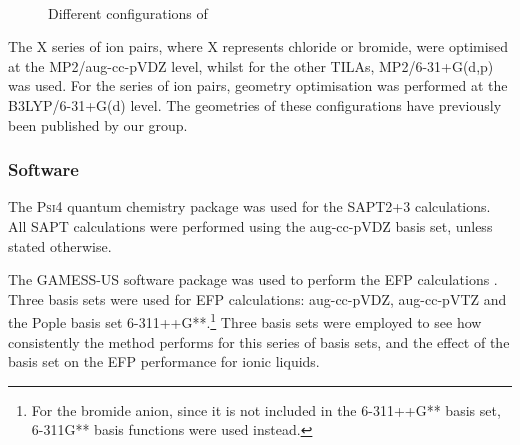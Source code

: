 \begin{figure}
    \centering
    \mbox{
    }
    \mbox{
    }                                 
    \mbox{                            
    }
    \caption{Different configurations of \protect{} \label{fig:conf-c2mpyr-ntf2}}
\end{figure}


The X series of ion pairs, where X represents chloride or bromide, were optimised at the MP2/aug-cc-pVDZ level, whilst for the other TILAs, MP2/6-31+G(d,p) was used.
For the  series of ion pairs, geometry optimisation was performed at the B3LYP/6-31+G(d) level.
The geometries of these configurations have previously been published by our group.
\cite{Izgorodina2014a, Rigby2014a}


\subsubsection{Software}

The \textsc{Psi4} quantum chemistry package was used for the SAPT2+3 calculations. 
\cite{Turney2012a}
All SAPT calculations were performed using the aug-cc-pVDZ basis set, unless stated otherwise.
\cite{Izgorodina2014a}

The GAMESS-US software package was used to perform the EFP calculations
\cite{Schmidt1993a, Gordon2005a}.
Three basis sets were used for EFP calculations: aug-cc-pVDZ, aug-cc-pVTZ and the Pople basis set 6-311++G**.\footnote{For the bromide anion, since it is not included in the 6-311++G** basis set, 6-311G** basis functions were used instead.}
Three basis sets were employed to see how consistently the method performs for this series of basis sets, and the effect of the basis set on the EFP performance for ionic liquids.

